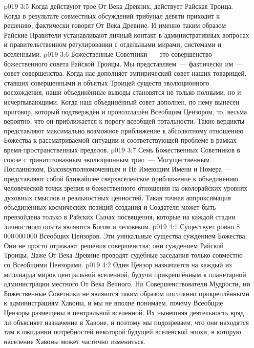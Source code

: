 \vs p019 3:5 Когда действуют трое От Века Древних, действует Райская Троица. Когда в результате совместных обсуждений трибунал девяти приходит к решению, фактически говорят От Века Древние. И именно таким образом Райские Правители устанавливают личный контакт в административных вопросах и правительственном регулировании с отдельными мирами, системами и вселенными.
\vs p019 3:6 \pc Божественные Советники~--- это совершенство божественного совета Райской Троицы. Мы представляем~--- фактически  им~--- совет совершенства. Когда нас дополняет эмпирический совет наших товарищей, ставших совершенными и объятых Троицей существ эволюционного восхождения, наши объединённые выводы становятся не только полными, но и исчерпывающими. Когда наш объединённый совет дополнен, по нему вынесен приговор, который подтверждён и провозглашён Всеобщим Цензором, то, весьма вероятно, что он приближается к порогу всеобщей тотальности. Такие вердикты представляют максимально возможное приближение к абсолютному отношению Божества к рассматриваемой ситуации и соответствующей проблеме в рамках время\hyp{}пространственных пределов.
\vs p019 3:7 Семь Божественных Советников в союзе с тринитизованным эволюционным трио~--- Могущественным Посланником, Высокоуполномоченным и Не Имеющим Имени и Номера~--- представляют собой ближайшее сверхвселенское приближение к объединению человеческой точки зрения и божественного отношения на околорайских уровнях духовных смыслов и реальностных ценностей. Такая точная аппроксимация объединённых космических позиций создания и Создателя может быть превзойдена только в Райских Сынах посвящения, которые на каждой стадии личностного опыта являются Богом и человеком.
\vs p019 4:1 Существует ровно 8\,000\,000\,000 Всеобщих Цензоров. Эти уникальные существа  суждением Божества. Они не просто отражают решения совершенства; они  суждением Райской Троицы. Даже От Века Древние проводят судебные заседания только совместно со Всеобщими Цензорами.
\vs p019 4:2 Один Цензор назначается на каждый из миллиарда миров центральной вселенной, будучи прикреплённым к планетарной администрации местного От Века Вечного. Ни Совершенствователи Мудрости, ни Божественные Советники не являются таким образом постоянно прикреплёнными к администрациям Хавоны, и мы не вполне понимаем, почему Всеобщие Цензоры размещены в центральной вселенной. Их нынешняя деятельность вряд ли объясняет назначение в Хавоне, и поэтому мы подозреваем, что они находятся там в ожидании потребностей некоторой будущей вселенской эпохи, в которую население Хавоны может частично измениться.
